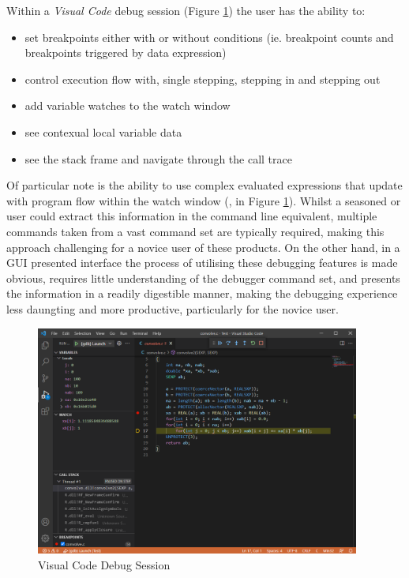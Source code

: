 Within a \emph{Visual Code} debug session (Figure \ref{fig:VisualCode}) the user has the ability to:

\begin{itemize}
\item set breakpoints either with or without conditions (ie. breakpoint counts and breakpoints triggered by data expression)
\item control execution flow with, single stepping, stepping in and stepping out
\item add variable watches to the watch window
\item see contexual local variable data
\item see the stack frame and navigate through the call trace
\end{itemize}

Of particular note is the ability to use complex evaluated expressions that update with program flow within the watch window (,  in Figure \ref{fig:VisualCode}). 
Whilst a seasoned  or  user could extract this information in the command line equivalent, multiple commands taken from a vast command set are typically required,
making this approach challenging for a novice user of these products. On the other hand, in a GUI presented interface the process of utilising these debugging features is made obvious, 
requires little understanding of the debugger command set, and presents the information in a readily digestible manner, making the debugging experience less daungting and more productive, 
particularly for the novice user. 

\begin{Schunk}
  \begin{figure}[htbp]
  {\centering \includegraphics[width=0.95\textwidth]{VisualCode} 

  }
  \caption[Visual Code Debug Session]{Visual Code Debug Session}\label{fig:VisualCode}
  \end{figure}
\end{Schunk}
  


